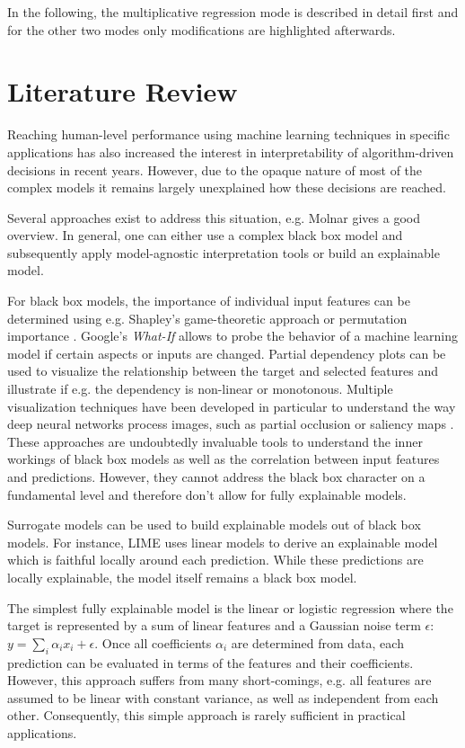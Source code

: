 \documentclass[BCOR=1mm, DIV=calc,10pt,
twoside=true,
twocolumn,
headings=normal]{scrartcl}
\begin{document}
In the following, the multiplicative regression mode is described in detail first and for
the other two modes only modifications are highlighted afterwards.


\section{Literature Review}

Reaching human-level performance using machine learning techniques in specific
applications has also increased the interest in interpretability of algorithm-driven
decisions in recent years. However, due to the opaque nature of most of the complex models
it remains largely unexplained how these decisions are reached.

Several approaches exist to address this situation, e.g. Molnar \cite{molnar2019} gives a
good overview. In general, one can either use a complex black box model and subsequently
apply model-agnostic interpretation tools or build an explainable model.

For black box models, the importance of individual input features can be determined 
using e.g. Shapley's game-theoretic approach \cite{Shapeley1953, SHAP} or permutation
importance \cite{Breiman2001, eli5}. Google's {\em What-If} \cite{GoogleWhatIf} allows to
probe the behavior of a machine learning model if certain aspects or inputs are changed.
Partial dependency plots \cite{friedman2001} can be used to visualize the relationship
between the target and selected features and illustrate if e.g. the dependency is
non-linear or monotonous. Multiple visualization techniques have been developed in
particular to understand the way deep neural networks process images, such as partial
occlusion \cite{Zeiler2013} or saliency maps \cite{Simonyan2013}. These approaches are
undoubtedly invaluable tools to understand the inner workings of black box models as well
as the correlation between input features and predictions. However, they cannot address
the black box character on a fundamental level and therefore don't allow for fully
explainable models.

Surrogate models can be used to build explainable models out of black box models. For
instance, LIME \cite{lime} uses linear models to derive an explainable model which is
faithful locally around each prediction. While these predictions are locally explainable,
the model itself remains a black box model.

The simplest fully explainable model is the linear or logistic regression where the target
is represented by a sum of linear features and a Gaussian noise term
$\epsilon$: $y = \sum_i \alpha_i x_i + \epsilon$. Once all coefficients $\alpha_i$ are
determined from  data, each prediction can be evaluated in terms of the features and
their coefficients. However, this approach suffers from many short-comings, e.g. all
features are assumed to be linear with constant variance, as well as independent from each
other. Consequently, this simple approach is rarely sufficient in practical
applications.
\end{document}
